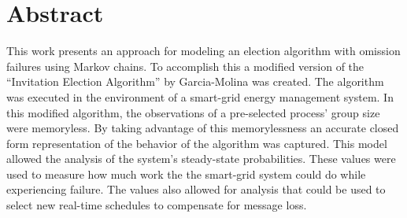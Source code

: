 \section{Abstract}

This work presents an approach for modeling an election algorithm with omission failures using Markov chains.
To accomplish this a modified version of the ``Invitation Election Algorithm'' by Garcia-Molina was created.
The algorithm was executed in the environment of a smart-grid energy management system.
In this modified algorithm, the observations of a pre-selected process' group size were memoryless.
By taking advantage of this memorylessness an accurate closed form representation of the behavior of the algorithm was captured.
This model allowed the analysis of the system's steady-state probabilities.
These values were used to measure how much work the the smart-grid system could do while experiencing failure.
The values also allowed for analysis that could be used to select new real-time schedules to compensate for message loss.

